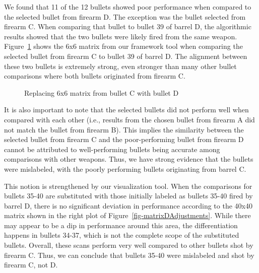 \documentclass[
  12pt]{article}
\begin{document}
We found that 11 of the 12 bullets showed poor performance when compared
to the selected bullet from firearm D. The exception was the bullet
selected from firearm C. When comparing that bullet to bullet 39 of
barrel D, the algorithmic results showed that the two bullets were
likely fired from the same weapon. Figure~\ref{fig-CD-Comparison} shows
the 6x6 matrix from our framework tool when comparing the selected
bullet from firearm C to bullet 39 of barrel D. The alignment between
these two bullets is extremely strong, even stronger than many other
bullet comparisons where both bullets originated from firearm C.

\begin{figure}


\caption{\label{fig-CD-Comparison}Replacing 6x6 matrix from bullet C
with bullet D}

\end{figure}%

It is also important to note that the selected bullets did not perform
well when compared with each other (i.e., results from the chosen bullet
from firearm A did not match the bullet from firearm B). This implies
the similarity between the selected bullet from firearm C and the
poor-performing bullet from firearm D cannot be attributed to
well-performing bullets being accurate among comparisons with other
weapons. Thus, we have strong evidence that the bullets were mislabeled,
with the poorly performing bullets originating from barrel C.

This notion is strengthened by our visualization tool. When the
comparisons for bullets 35-40 are substituted with those initially
labeled as bullets 35-40 fired by barrel D, there is no significant
deviation in performance according to the 40x40 matrix shown in the
right plot of Figure~\ref{fig-matrixDAdjustments}. While there may
appear to be a dip in performance around this area, the differentiation
happens in bullets 34-37, which is not the complete scope of the
substituted bullets. Overall, these scans perform very well compared to
other bullets shot by firearm C. Thus, we can conclude that bullets
35-40 were mislabeled and shot by firearm C, not D.
\end{document}
